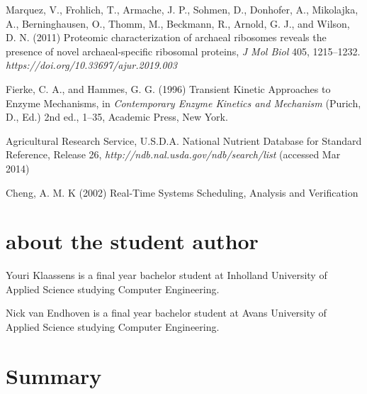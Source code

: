 \documentclass[10pt]{article}
\begin{document}
\begin{thebibliography}{9} %

 Marquez, V., Frohlich, T., Armache, J. P., Sohmen, D., Donhofer, A., Mikolajka, A., Berninghausen, O., Thomm, M., Beckmann, R., Arnold, G. J., and Wilson, D. N. (2011) Proteomic characterization of archaeal ribosomes reveals the presence of novel archaeal-specific ribosomal proteins, \textit{J Mol Biol} 405, 1215--1232. \textit {https://doi.org/10.33697/ajur.2019.003}

 Fierke, C. A., and Hammes, G. G. (1996) Transient Kinetic Approaches to Enzyme Mechanisms, in \textit{Contemporary Enzyme Kinetics and Mechanism} (Purich, D., Ed.) 2nd ed., 1--35, Academic Press, New York.

 Agricultural Research Service, U.S.D.A. National Nutrient Database for Standard Reference, Release 26, \textit{http://ndb.nal.usda.gov/ndb/search/list} (accessed Mar 2014)

 Cheng, A. M. K (2002) Real-Time Systems Scheduling, Analysis and Verification

\end{thebibliography}

\section*{about the student author}
Youri Klaassens is a final year bachelor student at Inholland University of Applied Science studying Computer Engineering.

Nick van Endhoven is a final year bachelor student at Avans University of Applied Science studying Computer Engineering.

\section{Summary}
\end{document}
